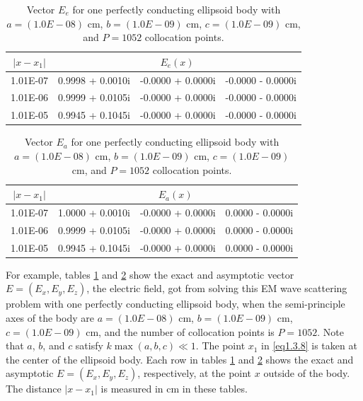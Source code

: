 \documentclass[12pt]{article}
\numberwithin{equation}{section}
\begin{document}
\begin{table}[htb]
  \centering
  \caption{Vector $E_e$ for one perfectly conducting ellipsoid body with $a=(1.0E-08)$ cm, $b=(1.0E-09)$ cm, $c=(1.0E-09)$ cm, and $P=1052$ collocation points.}
    \begin{tabular}{crrr}
    \toprule
    $|x-x_1|$ & \multicolumn{3}{c}{$E_{e}(x)$} \\
    \midrule
    	1.01E-07 & 0.9998 + 0.0010i & -0.0000 + 0.0000i & -0.0000 - 0.0000i \\
    	1.01E-06 & 0.9999 + 0.0105i & -0.0000 + 0.0000i & -0.0000 - 0.0000i \\
    	1.01E-05 & 0.9945 + 0.1045i & -0.0000 + 0.0000i & -0.0000 - 0.0000i \\
    \bottomrule
    \end{tabular}%
  \label{tab3.2.1}%
\end{table}%
\begin{table}[htb]
  \centering
  \caption{Vector $E_a$ for one perfectly conducting ellipsoid body with $a=(1.0E-08)$ cm, $b=(1.0E-09)$ cm, $c=(1.0E-09)$ cm, and $P=1052$ collocation points.}
    \begin{tabular}{crrr}
    \toprule
    $|x-x_1|$ & \multicolumn{3}{c}{$E_{a}(x)$} \\
    \midrule
	1.01E-07 & 1.0000 + 0.0010i & -0.0000 + 0.0000i & 0.0000 - 0.0000i \\
    1.01E-06 & 0.9999 + 0.0105i & -0.0000 + 0.0000i & 0.0000 - 0.0000i \\
    1.01E-05 & 0.9945 + 0.1045i & -0.0000 + 0.0000i & 0.0000 - 0.0000i \\    	
    \bottomrule
    \end{tabular}%
  \label{tab3.2.2}%
\end{table}%
For example, tables \ref{tab3.2.1} and \ref{tab3.2.2} show the exact and asymptotic vector $E=(E_x,E_y,E_z)$, the electric field, got from solving this EM wave scattering problem with one perfectly conducting ellipsoid body, when the semi-principle axes of the body are $a=(1.0E-08)$ cm, $b=(1.0E-09)$ cm, $c=(1.0E-09)$ cm, and the number of collocation points is $P=1052$. Note that $a$, $b$, and $c$ satisfy $k\max(a,b,c) \ll 1$. The point $x_1$ in \eqref{eq1.3.8} is taken at the center of the ellipsoid body. Each row in tables \ref{tab3.2.1} and \ref{tab3.2.2} shows the exact and asymptotic $E=(E_x,E_y,E_z)$, respectively, at the point $x$ outside of the body. The distance $|x-x_1|$ is measured in cm in these tables.
\end{document}
